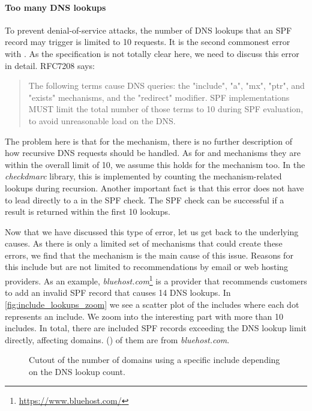 \paragraph{Too many DNS lookups}
To prevent denial-of-service attacks, the number of DNS lookups that an SPF record may trigger is limited to 10 requests.
It is the second commonest error with \SPFTooManyDNSLookupsPerc.
As the specification is not totally clear here, we need to discuss this error in detail.
RFC7208 says:
\begin{quote}\color{cbone}
The following terms cause DNS queries: the "include", "a", "mx", "ptr", and "exists" mechanisms, and the "redirect" modifier.
SPF implementations MUST limit the total number of those terms to 10 during SPF evaluation, to avoid unreasonable load on the DNS.
\end{quote}

The problem here is that for the  mechanism, there is no further description of how recursive DNS requests should be handled.
As for  and  mechanisms they are within the overall limit of 10, we assume this holds for the  mechanism too.
In the \emph{checkdmarc} library, this is implemented by counting the mechanism-related lookups during recursion.
Another important fact is that this error does not have to lead directly to a  in the SPF check. The SPF check can be successful if a result is returned within the first 10 lookups.

Now that we have discussed this type of error, let us get back to the underlying causes.
As there is only a limited set of mechanisms that could create these errors, we find that the  mechanism is the main cause of this issue. 
Reasons for this include but are not limited to recommendations by email or web hosting providers.
As an example, \textit{bluehost.com}\footnote{\url{https://www.bluehost.com/}} is a provider that recommends customers to add an invalid SPF record that causes 14 DNS lookups.
In \autoref{fig:include_lookups_zoom} we see a scatter plot of the includes where each dot represents an include.
We zoom into the interesting part with more than 10 includes.
In total, there are \numprint{\IncludesGeTen} included SPF records exceeding the DNS lookup limit directly, affecting \numprint{\IncludesGeTenDomains} domains.
\numprint{\IncludesBluehostCom} (\IncludesBluehostComPerc) of them are from \textit{bluehost.com}.

\begin{figure}[htbp]
	\centerline{}
	\vspace{-6pt}
	\caption{Cutout of the number of domains using a specific include depending on the DNS lookup count.}
	\label{fig:include_lookups_zoom}
\end{figure}

